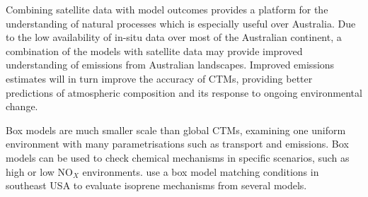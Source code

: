       Combining satellite data with model outcomes provides a platform for the understanding of natural processes which is especially useful over Australia.
      Due to the low availability of in-situ data over most of the Australian continent, a combination of the models with satellite data may provide improved understanding of emissions from Australian landscapes.
      Improved emissions estimates will in turn improve the accuracy of CTMs, providing better predictions of atmospheric composition and its response to ongoing environmental change.
      
      Box models are much smaller scale than global CTMs, examining one uniform environment with many parametrisations such as transport and emissions.
      Box models can be used to check chemical mechanisms in specific scenarios, such as high or low NO$_X$ environments.
      \cite{Marvin2017} use a box model matching conditions in southeast USA to evaluate isoprene mechanisms from several models.
      
